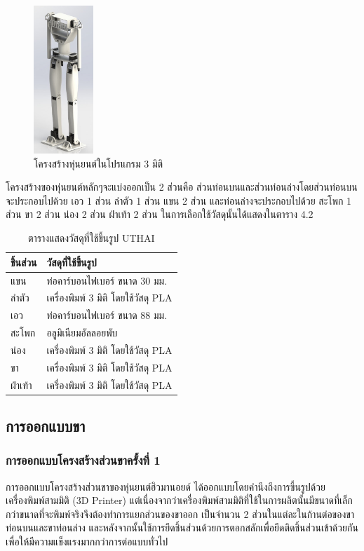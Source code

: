 \begin{figure}[h!]
    \centering
    \includegraphics[width=0.2\textwidth]{chapter4/images/UTHAI_ver_1.jpg}
    \caption{โครงสร้างหุ่นยนต์ในโปรแกรม 3 มิติ}
    \label{fig:UTHAI_ver_1}
\end{figure}

โครงสร้างของหุ่นยนต์หลักๆจะแบ่งออกเป็น 2 ส่วนคือ ส่วนท่อนบนและส่วนท่อนล่างโดยส่วนท่อนบนจะประกอบไปด้วย 
เอว 1 ส่วน ลำตัว 1 ส่วน แขน 2 ส่วน และท่อนล่างจะประกอบไปด้วย สะโพก 1 ส่วน ขา 2 ส่วน น่อง 2 ส่วน ฝ่าเท้า 2 ส่วน 
ในการเลือกใช้วัสดุนั้นได้แสดงในตาราง 4.2

\begin{table}[ht]
	\centering
	\begin{tabular}{| l | l |}
		\hline
		ชิ้นส่วน & วัสดุที่ใช้ขึ้นรูป \\
        \hline
        แขน	& ท่อคาร์บอนไฟเบอร์ ขนาด 30 มม. \\
        ลำตัว & เครื่องพิมพ์ 3 มิติ โดยใช้วัสดุ PLA \\
        เอว	& ท่อคาร์บอนไฟเบอร์ ขนาด 88 มม. \\
        สะโพก & อลูมิเนียมอัลลอยพับ \\
        น่อง & เครื่องพิมพ์ 3 มิติ โดยใช้วัสดุ PLA \\
        ขา & เครื่องพิมพ์ 3 มิติ โดยใช้วัสดุ PLA \\
        ฝ่าเท้า	& เครื่องพิมพ์ 3 มิติ โดยใช้วัสดุ PLA \\
	    \hline
	\end{tabular}
	\caption{ตารางแสดงวัสดุที่ใช้ขึ้นรูป UTHAI}
	\label{tab:UTHAI_material}
\end{table}

\clearpage
\subsection{การออกแบบขา}
\subsubsection{การออกแบบโครงสร้างส่วนขาครั้งที่ 1}
การออกแบบโครงสร้างส่วนขาของหุ่นยนต์ฮิวมานอยด์ ได้ออกแบบโดยคำนึงถึงการขึ้นรูปด้วยเครื่องพิมพ์สามมิติ (3D Printer) 
แต่เนื่องจากว่าเครื่องพิมพ์สามมิติที่ใช้ในการผลิตนั้นมีขนาดที่เล็กกว่าขนาดที่จะพิมพ์จริงจึงต้องทำการแยกส่วนของขาออก
เป็นจำนวน 2 ส่วนในแต่ละในก้านต่อของขาท่อนบนและขาท่อนล่าง และหลังจากนั้นใช้การยึดชิ้นส่วนด้วยการตอกสลักเพื่อยึดติดชิ้นส่วนเข้าด้วยกัน
เพื่อให้มีความแข็งแรงมากกว่าการต่อแบบทั่วไป

